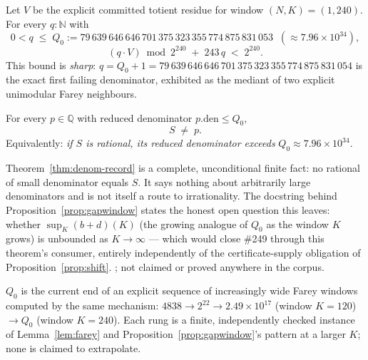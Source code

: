 \begin{prop}[The wave-17 gap certificate at window $K=240$]
\label{prop:gapwindow}
Let $V$ be the explicit committed totient residue for window $(N,K)=(1,240)$.
For every $q : \mathbb{N}$ with
\[
0 < q \;\le\; Q_0 := 79\,639\,646\,646\,701\,375\,323\,355\,774\,875\,831\,053 \;\;(\approx 7.96\times 10^{34}),
\]
\[
(q \cdot V) \bmod 2^{240} \;+\; 243\,q \;<\; 2^{240}.
\]
This bound is \emph{sharp}: $q = Q_0+1 = 79\,639\,646\,646\,701\,375\,323\,355\,774\,875\,831\,054$
is the exact first failing denominator, exhibited as the mediant of two
explicit unimodular Farey neighbours.
  
\end{prop}

\begin{thm}
\label{thm:denom-record}
For every $p \in \mathbb{Q}$ with reduced denominator $p.\mathrm{den} \le Q_0$,
\[
S \;\neq\; p.
\]
Equivalently: \emph{if $S$ is rational, its reduced denominator exceeds}
$Q_0 \approx 7.96 \times 10^{34}$.
  
\end{thm}

\begin{rem}
Theorem~\ref{thm:denom-record} is a complete, unconditional finite fact: no rational
of small denominator equals $S$. It says nothing about arbitrarily large
denominators and is not itself a route to irrationality. The docstring behind
Proposition~\ref{prop:gapwindow} states the honest open question this leaves:
whether $\sup_K (b+d)(K)$ (the growing analogue of $Q_0$ as the window $K$
grows) is unbounded as $K \to \infty$ --- which would close \#249 through this
theorem's consumer, entirely independently of the certificate-supply
obligation of Proposition~\ref{prop:shift}. ; not claimed or proved
anywhere in the corpus.
\end{rem}

\begin{rem}
$Q_0$ is the current end of an explicit sequence of increasingly wide Farey
windows computed by the same mechanism: $4838 \to 2^{22} \to 2.49\times10^{17}$
(window $K=120$) $\to Q_0$ (window $K=240$). Each rung is a finite,
independently checked instance of Lemma~\ref{lem:farey} and
Proposition~\ref{prop:gapwindow}'s pattern at a larger $K$; none is claimed to
extrapolate.
\end{rem}

